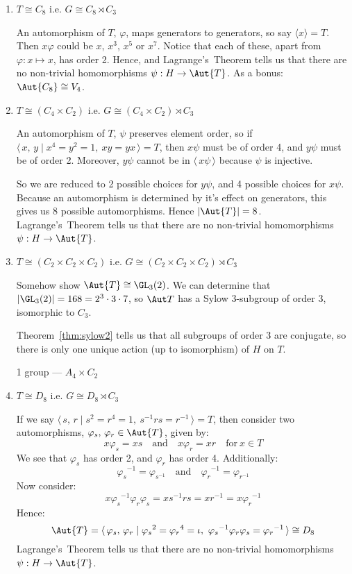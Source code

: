 \begin{enumerate}
    \item \(T \cong C_8\) i.e. \(G \cong C_8 \rtimes C_3\)

        An automorphism of \(T\), \(\varphi\), maps generators to generators, so say \(\langle x \rangle = T\).
        Then \(x\varphi\) could be \(x\), \(x^3\), \(x^5\) or \(x^7\).
        Notice that each of these, apart from \(\varphi:x \mapsto x\), has order 2.
        Hence, and Lagrange's~Theorem tells us that there are no non-trivial homomorphisms \(\psi:H \to \Aut{T}\).
        As a bonus: \(\Aut{C_8} \cong V_4\).

    \item \(T \cong (C_4 \times C_2)\) i.e. \(G \cong (C_4 \times C_2) \rtimes C_3\)

        An automorphism of \(T\), \(\psi\) preserves element order, so if \(\langle\,x,\,y \mid x^4 = y^2 = 1,\ xy =
        yx\,\rangle = T\), then \(x\psi\) must be of order 4, and \(y\psi\) must be of order 2.
        Moreover, \(y\psi\) cannot be in \(\langle\,x\psi\,\rangle\) because \(\psi\) is injective.

        So we are reduced to 2 possible choices for \(y\psi\), and 4 possible choices for \(x\psi\).
        Because an automorphism is determined by it's effect on generators, this gives us 8 possible automorphisms.
        Hence \(|\Aut{T}| = 8\).
        Lagrange's~Theorem tells us that there are no non-trivial homomorphisms \(\psi:H \to \Aut{T}\).

    \item \(T \cong (C_2 \times C_2 \times C_2)\) i.e. \(G \cong (C_2 \times C_2 \times C_2) \rtimes C_3\)

        Somehow show \(\Aut{T} \cong \GL_3(2)\).
        We can determine that \(|\GL_3(2)| = 168 = 2^3 \cdot 3 \cdot 7\), so \(\Aut T\) has a Sylow 3-subgroup of order
        3, isomorphic to \(C_3\).

        Theorem~\ref{thm:sylow2} tells us that all subgroups of order 3 are conjugate, so there is only one unique
        action (up to isomorphism) of \(H\) on \(T\).

        1 group --- \(A_4 \times C_2\)
    \item \(T \cong D_8\) i.e. \(G \cong D_8 \rtimes C_3\)

        If we say \(\langle\,s,\,r \mid s^2 = r^4 = 1,\ s^{-1}rs = r^{-1}\,\rangle = T\), then consider two
        automorphisms, \(\varphi_s,\,\varphi_r \in
        \Aut{T}\), given by:
        \[x\varphi_s = xs \quad \text{and} \quad x\varphi_r = xr \quad \text{for}\ x \in T\]
        We see that \(\varphi_s\) has order 2, and \(\varphi_r\) has order 4.
        Additionally:
        \[{\varphi_s}^{-1} = \varphi_{s^{-1}} \quad \text{and} \quad {\varphi_r}^{-1} = \varphi_{r^{-1}}\]
        Now consider:
        \[x{\varphi_s}^{-1}{\varphi_r}{\varphi_s} = xs^{-1}rs = xr^{-1} = x{\varphi_r}^{-1}\]
        Hence:
        \[\Aut{T} = \langle\, \varphi_s,\,\varphi_r \mid {\varphi_s}^2 = {\varphi_r}^4 = \iota,\
        {\varphi_s}^{-1}{\varphi_r}{\varphi_s} = {\varphi_r}^{-1}\,\rangle \cong D_8\]
        Lagrange's~Theorem tells us that there are no non-trivial homomorphisms \(\psi:H \to \Aut{T}\).


\end{enumerate}
